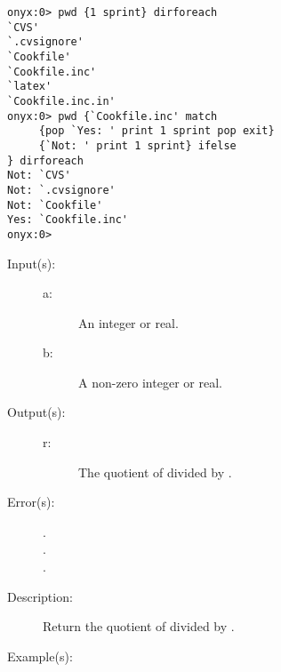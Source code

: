 \begin{description}
\begin{description}
\begin{verbatim}
onyx:0> pwd {1 sprint} dirforeach
`CVS'
`.cvsignore'
`Cookfile'
`Cookfile.inc'
`latex'
`Cookfile.inc.in'
onyx:0> pwd {`Cookfile.inc' match
     {pop `Yes: ' print 1 sprint pop exit}
     {`Not: ' print 1 sprint} ifelse
} dirforeach
Not: `CVS'
Not: `.cvsignore'
Not: `Cookfile'
Yes: `Cookfile.inc'
onyx:0>
		\end{verbatim}
	\end{description}
\label{systemdict:div}
\item[{\onyxop{a b}{div}{r}}: ]
	\begin{description}\item[]
	\item[Input(s): ]
		\begin{description}\item[]
		\item[a: ]
			An integer or real.
		\item[b: ]
			A non-zero integer or real.
		\end{description}
	\item[Output(s): ]
		\begin{description}\item[]
		\item[r: ]
			The quotient of  divided by .
		\end{description}
	\item[Error(s): ]
		\begin{description}\item[]
		\item[.]
		\item[.]
		\item[.]
		\end{description}
	\item[Description: ]
		Return the quotient of  divided by .
	\item[Example(s): ]\begin{verbatim}


\end{verbatim}
\end{description}
\end{description}
